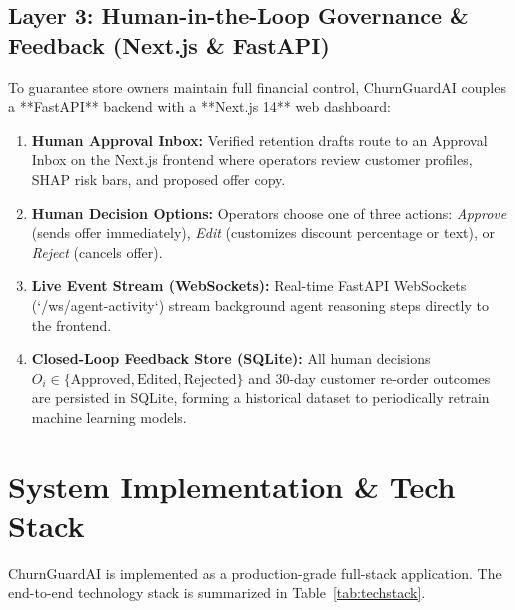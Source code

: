 \documentclass[conference]{IEEEtran}
\begin{document}
\subsection{Layer 3: Human-in-the-Loop Governance \& Feedback (Next.js \& FastAPI)}
To guarantee store owners maintain full financial control, ChurnGuardAI couples a **FastAPI** backend with a **Next.js 14** web dashboard:
\begin{enumerate}
    \item \textbf{Human Approval Inbox:} Verified retention drafts route to an Approval Inbox on the Next.js frontend where operators review customer profiles, SHAP risk bars, and proposed offer copy.
    \item \textbf{Human Decision Options:} Operators choose one of three actions: \textit{Approve} (sends offer immediately), \textit{Edit} (customizes discount percentage or text), or \textit{Reject} (cancels offer).
    \item \textbf{Live Event Stream (WebSockets):} Real-time FastAPI WebSockets (`/ws/agent-activity`) stream background agent reasoning steps directly to the frontend.
    \item \textbf{Closed-Loop Feedback Store (SQLite):} All human decisions $O_i \in \{\text{Approved}, \text{Edited}, \text{Rejected}\}$ and 30-day customer re-order outcomes are persisted in SQLite, forming a historical dataset to periodically retrain machine learning models.
\end{enumerate}

\section{System Implementation \& Tech Stack}
ChurnGuardAI is implemented as a production-grade full-stack application. The end-to-end technology stack is summarized in Table~\ref{tab:techstack}.
\end{document}
